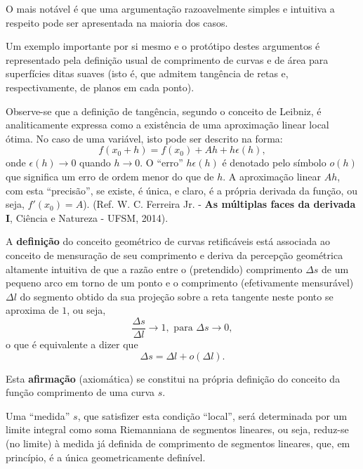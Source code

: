 {

O mais notável é que uma argumentação razoavelmente simples e intuitiva a respeito pode ser apresentada na maioria dos casos.

Um exemplo importante por si mesmo e o protótipo destes argumentos é representado pela definição usual de comprimento de curvas e de área para superfícies ditas suaves (isto é, que admitem tangência de retas e, respectivamente, de planos em cada ponto).

Observe-se que a definição de tangência, segundo o conceito de Leibniz, é analiticamente expressa como a existência de uma aproximação linear local ótima. No caso de uma variável, isto pode ser descrito na forma:
\[f(x_0+h) = f(x_0)+Ah+h\epsilon(h),\]
onde \(\epsilon(h) \to 0\) quando \(h \to 0\). O ``erro'' \(h\epsilon(h)\) é denotado pelo símbolo \(o(h)\) que significa um erro de ordem menor do que de \(h\). A aproximação linear \(Ah\), com esta ``precisão'', se existe, é única, e claro, é a própria derivada da função, ou seja, \(f'(x_0) = A\)). (Ref. W. C. Ferreira Jr. - \textbf{As múltiplas faces da derivada I}, Ciência e Natureza - UFSM, 2014).

A \textbf{definição} do conceito geométrico de curvas retificáveis está associada ao conceito de mensuração de seu comprimento e deriva da percepção geométrica altamente intuitiva de que a razão entre o (pretendido) comprimento \(\Delta s\) de um pequeno arco em torno de um ponto e o comprimento (efetivamente mensurável) \(\Delta l\) do segmento obtido da sua projeção sobre a reta tangente neste ponto se aproxima de \(1\), ou seja,
\[\dfrac{\Delta s}{\Delta l} \to 1,
\mbox{ para } \Delta s \to 0,\]
o que é equivalente a dizer que
\[\Delta s = \Delta l + o(\Delta l).\]


Esta \textbf{afirmação} (axiomática) se constitui na própria definição do conceito da função comprimento de uma curva \(s\).

Uma ``medida'' \(s\), que satisfizer esta condição ``local'', será determinada por um limite integral como soma Riemanniana de segmentos lineares, ou seja, reduz-se (no limite) à medida já definida de comprimento de segmentos lineares, que, em princípio, é a única geometricamente definível.

}

